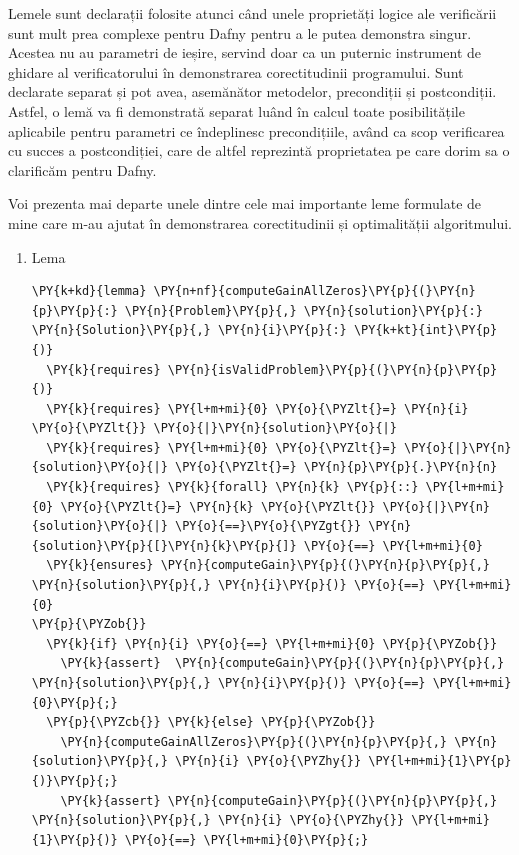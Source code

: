 \begin{sloppypar}
Lemele sunt declarații folosite atunci când unele proprietăți logice ale verificării sunt mult prea complexe pentru Dafny pentru a le putea demonstra singur. Acestea nu au parametri de ieșire, servind doar ca un puternic instrument de ghidare al verificatorului în demonstrarea corectitudinii programului. Sunt declarate separat și pot avea, asemănător metodelor, precondiții și postcondiții. Astfel, o lemă va fi demonstrată separat luând în calcul toate posibilitățile aplicabile pentru parametri ce îndeplinesc precondițiile, având ca scop verificarea cu succes a postcondiției, care de altfel reprezintă proprietatea pe care dorim sa o clarificăm pentru Dafny. \par
Voi prezenta mai departe unele dintre cele mai importante leme formulate de mine care m-au ajutat în demonstrarea corectitudinii și optimalității algoritmului. \par
\begin{enumerate}
    \item Lema  
    \begin{Verbatim}[commandchars=\\\{\}]
\PY{k+kd}{lemma} \PY{n+nf}{computeGainAllZeros}\PY{p}{(}\PY{n}{p}\PY{p}{:} \PY{n}{Problem}\PY{p}{,} \PY{n}{solution}\PY{p}{:} \PY{n}{Solution}\PY{p}{,} \PY{n}{i}\PY{p}{:} \PY{k+kt}{int}\PY{p}{)}
  \PY{k}{requires} \PY{n}{isValidProblem}\PY{p}{(}\PY{n}{p}\PY{p}{)}
  \PY{k}{requires} \PY{l+m+mi}{0} \PY{o}{\PYZlt{}=} \PY{n}{i} \PY{o}{\PYZlt{}} \PY{o}{|}\PY{n}{solution}\PY{o}{|}
  \PY{k}{requires} \PY{l+m+mi}{0} \PY{o}{\PYZlt{}=} \PY{o}{|}\PY{n}{solution}\PY{o}{|} \PY{o}{\PYZlt{}=} \PY{n}{p}\PY{p}{.}\PY{n}{n} 
  \PY{k}{requires} \PY{k}{forall} \PY{n}{k} \PY{p}{::} \PY{l+m+mi}{0} \PY{o}{\PYZlt{}=} \PY{n}{k} \PY{o}{\PYZlt{}} \PY{o}{|}\PY{n}{solution}\PY{o}{|} \PY{o}{==}\PY{o}{\PYZgt{}} \PY{n}{solution}\PY{p}{[}\PY{n}{k}\PY{p}{]} \PY{o}{==} \PY{l+m+mi}{0}
  \PY{k}{ensures} \PY{n}{computeGain}\PY{p}{(}\PY{n}{p}\PY{p}{,} \PY{n}{solution}\PY{p}{,} \PY{n}{i}\PY{p}{)} \PY{o}{==} \PY{l+m+mi}{0}
\PY{p}{\PYZob{}}
  \PY{k}{if} \PY{n}{i} \PY{o}{==} \PY{l+m+mi}{0} \PY{p}{\PYZob{}}
    \PY{k}{assert}  \PY{n}{computeGain}\PY{p}{(}\PY{n}{p}\PY{p}{,} \PY{n}{solution}\PY{p}{,} \PY{n}{i}\PY{p}{)} \PY{o}{==} \PY{l+m+mi}{0}\PY{p}{;}
  \PY{p}{\PYZcb{}} \PY{k}{else} \PY{p}{\PYZob{}}
    \PY{n}{computeGainAllZeros}\PY{p}{(}\PY{n}{p}\PY{p}{,} \PY{n}{solution}\PY{p}{,} \PY{n}{i} \PY{o}{\PYZhy{}} \PY{l+m+mi}{1}\PY{p}{)}\PY{p}{;}
    \PY{k}{assert} \PY{n}{computeGain}\PY{p}{(}\PY{n}{p}\PY{p}{,} \PY{n}{solution}\PY{p}{,} \PY{n}{i} \PY{o}{\PYZhy{}} \PY{l+m+mi}{1}\PY{p}{)} \PY{o}{==} \PY{l+m+mi}{0}\PY{p}{;}

\end{Verbatim}
\end{enumerate}
\end{sloppypar}
